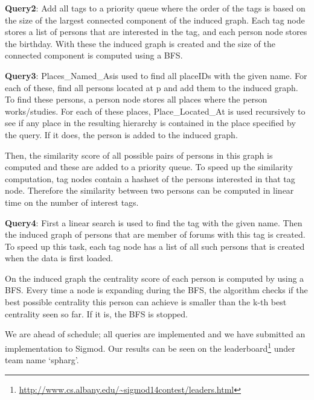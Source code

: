 \documentclass{article}
\begin{document}
\textbf{Query2}: Add all tags to a priority queue where the order of
the tags is based on the size of the largest connected component of
the induced graph. Each tag node stores a list of persons that are
interested in the tag, and each person node stores the birthday. With
these the induced graph is created and the size of the connected
component is computed using a BFS.
              
\textbf{Query3}: Places\_Named\_Asis used to find all placeIDs with
the given name. For each of these, find all persons located at p and
add them to the induced graph. To find these persons, a person node
stores all places where the person works/studies. For each of these
places, Place\_Located\_At is used recursively to see if any place in
the resulting hierarchy is contained in the place specified by the
query. If it does, the person is added to the induced graph.
              
Then, the similarity score of all possible pairs of persons in this
graph is computed and these are added to a priority queue. To speed up
the similarity computation, tag nodes contain a hashset of the persons
interested in that tag node. Therefore the similarity between two
persons can be computed in linear time on the number of interest tags.
              
\textbf{Query4}: First a linear search is used to find the tag with
the given name. Then the induced graph of persons that are member of
forums with this tag is created. To speed up this task, each tag node
has a list of all such persons that is created when the data is first
loaded.
               
On the induced graph the centrality score of each person is computed
by using a BFS. Every time a node is expanding during the BFS, the
algorithm checks if the best possible centrality this person can
achieve is smaller than the k-th best centrality seen so far. If it
is, the BFS is stopped.
    
We are ahead of schedule; all queries are implemented and we have
submitted an implementation to Sigmod.  Our results can be seen on the
leaderboard\footnote{\url{http://www.cs.albany.edu/~sigmod14contest/leaders.html}} under team name `spharg'.
\end{document}
